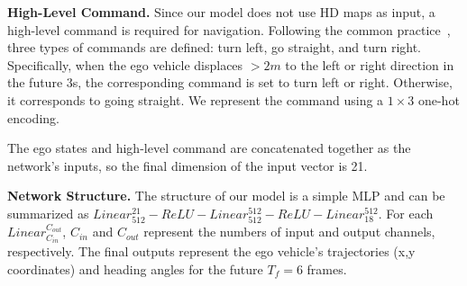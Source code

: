 \documentclass[10pt,twocolumn,letterpaper]{article}
\newcommand{\myPara}[1]{\vspace{.05in}\noindent\textbf{#1.}\quad}
\begin{document}
\myPara{High-Level Command}
Since our model does not use HD maps as input, a high-level command is required for navigation. 
Following the common practice~\cite{hu2022st,hu2022goal}, three types of commands are defined: 
turn left, go straight, and turn right. 
Specifically, when the ego vehicle displaces $>2m$ to the left or right direction in the future 3s, the corresponding command is set to turn left or right. 
Otherwise, it corresponds to going straight. 
We represent the command using a $1 \times 3$ one-hot encoding.  

The ego states and high-level command are 
concatenated together as the network's inputs, so the final dimension of the input vector is 21.

\myPara{Network Structure}
The structure of our model is a simple
MLP 
and can be summarized as $Linear_{512}^{21}-ReLU-Linear_{512}^{512}-ReLU-Linear_{18}^{512}$.
For each $Linear_{C_{in}}^{C_{out}}$, 
$C_{in}$ and $C_{out}$ represent the numbers of 
input and output channels, respectively.
The final outputs represent the ego vehicle's trajectories (x,y coordinates) and heading angles for the future $T_f=6$ frames.
\end{document}
